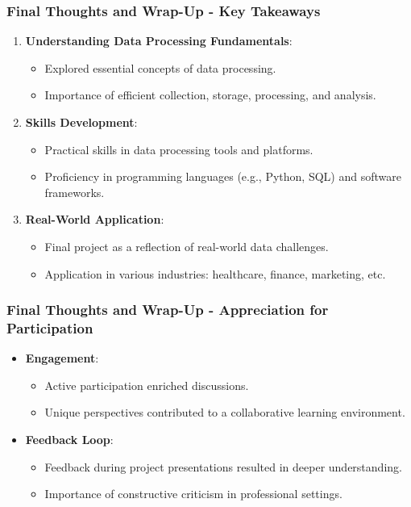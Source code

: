 \documentclass[aspectratio=169]{beamer}
\begin{document}
\begin{frame}[fragile]
  \frametitle{Final Thoughts and Wrap-Up - Key Takeaways}
  \begin{enumerate}
    \item \textbf{Understanding Data Processing Fundamentals}:
      \begin{itemize}
        \item Explored essential concepts of data processing.
        \item Importance of efficient collection, storage, processing, and analysis.
      \end{itemize}
  
    \item \textbf{Skills Development}:
      \begin{itemize}
        \item Practical skills in data processing tools and platforms.
        \item Proficiency in programming languages (e.g., Python, SQL) and software frameworks.
      \end{itemize}
  
    \item \textbf{Real-World Application}:
      \begin{itemize}
        \item Final project as a reflection of real-world data challenges.
        \item Application in various industries: healthcare, finance, marketing, etc.
      \end{itemize}
  \end{enumerate}
\end{frame}

\begin{frame}[fragile]
  \frametitle{Final Thoughts and Wrap-Up - Appreciation for Participation}
  \begin{itemize}
    \item \textbf{Engagement}:
      \begin{itemize}
        \item Active participation enriched discussions.
        \item Unique perspectives contributed to a collaborative learning environment.
      \end{itemize}
    
    \item \textbf{Feedback Loop}:
      \begin{itemize}
        \item Feedback during project presentations resulted in deeper understanding.
        \item Importance of constructive criticism in professional settings.
      \end{itemize}
  \end{itemize}
\end{frame}
\end{document}
